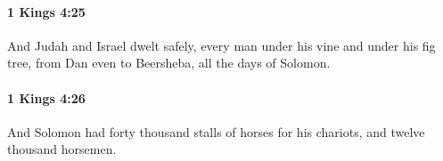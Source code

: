 		\paragraph{1 Kings 4:25} %
			\label{1KINGS-4-25}

			And Judah and Israel dwelt safely, every man under his vine and under his fig tree, from Dan even to Beersheba, all the days of Solomon.


		\paragraph{1 Kings 4:26} %
			\label{1KINGS-4-26}

			And Solomon had forty thousand stalls of horses for his chariots, and twelve thousand horsemen.


